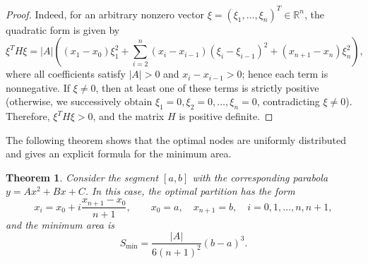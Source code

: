 \documentclass[amstex,16pt, amssymb]{article}
\theoremstyle{plain}
\newtheorem{theorem}{Theorem}[section]
\theoremstyle{definition}
\numberwithin{equation}{section}
\numberwithin{equation}{section}
\begin{document}
\begin{proof} Indeed, for an arbitrary nonzero vector \( \xi = (\xi_1, \ldots, \xi_n)^{T} \in \mathbb{R}^n \), the quadratic form is given by
\[
\xi^T H \xi = |A| \left( (x_1 - x_0) \xi_1^2 + \sum_{i=2}^n (x_i - x_{i-1})(\xi_i - \xi_{i-1})^2 + (x_{n+1} - x_n) \xi_n^2 \right),
\]
where all coefficients satisfy \( |A| > 0 \) and \( x_i - x_{i-1} > 0 \); hence each term is nonnegative. If \( \xi \neq 0 \), then at least one of these terms is strictly positive (otherwise, we successively obtain \( \xi_1 = 0, \xi_2 = 0, \ldots, \xi_n = 0 \), contradicting \( \xi \neq 0 \)). Therefore, \( \xi^T H \xi > 0 \), and the matrix \( H \) is positive definite. 
\end{proof}

The following
theorem shows that the optimal nodes are uniformly distributed and
gives an explicit formula for the minimum area.

\begin{theorem}\label{theorem1}
{\it Consider the segment $[a, b]$ with the corresponding parabola $y = Ax^2 + Bx + C$.
In this case, the optimal partition has the form
$$
x_i = x_0 + i \frac{x_{n+1} - x_0}{n+1}, \qquad
x_0 = a, \quad x_{n+1} = b, \quad i = 0, 1, \ldots, n, n+1,
$$
and the minimum area is
$$
S_{\min} = \frac{|A|}{6(n+1)^2}(b-a)^3.
$$}
\end{theorem}
\end{document}
